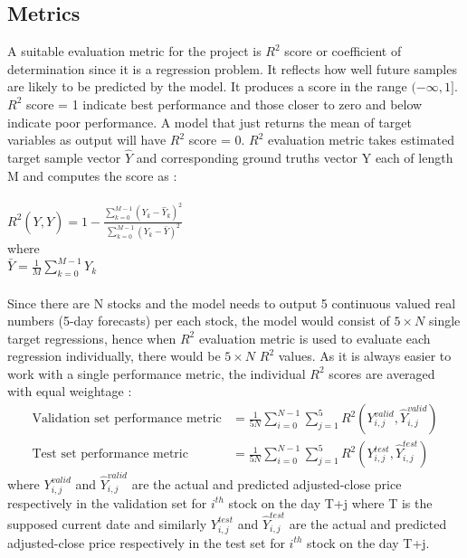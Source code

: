 \documentclass[10pt]{report}
\begin{document}
\subsection*{Metrics}
A suitable evaluation metric for the project is $R^2$ score or coefficient of determination\cite{r2score} since it is a regression problem. It reflects how well future samples are likely to be predicted by the
model. It produces a score in the range $(-\infty, 1]$. $R^2$ score = 1 indicate best performance and those closer to zero and below indicate poor performance. A model that just returns the mean of target variables as output will have $R^2$ score = 0. $R^2$ evaluation metric takes estimated target sample vector $\hat{Y}$ and corresponding ground truths vector Y each of length M and computes the score as :\\
\\
$R^2\left(Y, \hat{Y}\right) = 1 - \frac{\displaystyle\sum_{k=0}^{M-1} \left(Y_k - \hat{Y}_k\right)^2}{\displaystyle\sum_{k=0}^{M-1} \left(Y_k - \bar{Y}\right)^2}$\\
where\\
$\bar{Y} = \frac{1}{M} \displaystyle\sum_{k=0}^{M-1} Y_k$
\\
\\
Since there are N stocks and the model needs to output 5 continuous valued real numbers (5-day forecasts) per each stock, the model would consist of $5 \times N$ single target regressions, hence when $R^2$ evaluation metric is used to evaluate each regression individually, there would be $5 \times N$ $R^2$ values. As it is always easier to work with a single performance metric, the individual $R^2$ scores are averaged with equal weightage :\\
\begin{align*}
\text{Validation set performance metric} &= \frac{1}{5N} \displaystyle\sum_{i=0}^{N-1} \displaystyle\sum_{j=1}^{5} R^2\left(Y_{i,j}^{valid}, \hat{Y}_{i,j}^{valid}\right)\\
\text{Test set performance metric} &= \frac{1}{5N} \displaystyle\sum_{i=0}^{N-1} \displaystyle\sum_{j=1}^{5} R^2\left(Y_{i,j}^{test}, \hat{Y}_{i,j}^{test}\right)
\end{align*}
where $Y_{i,j}^{valid}$ and $\hat{Y}_{i,j}^{valid}$ are the actual and predicted adjusted-close price respectively in the validation set for $i^{th}$ stock on the day T+j where T is the supposed current date
and similarly $Y_{i,j}^{test}$ and $\hat{Y}_{i,j}^{test}$ are the actual and predicted adjusted-close price respectively in the test set for $i^{th}$ stock on the day T+j.
\end{document}
